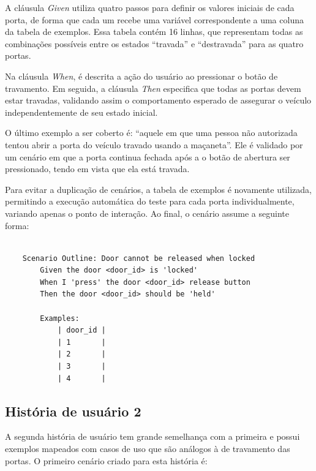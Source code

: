 A cláusula \textit{Given} utiliza quatro passos para definir os valores iniciais de cada porta, de forma que cada um recebe uma variável correspondente a uma coluna da 
tabela de exemplos. Essa tabela contém 16 linhas, que representam todas as combinações possíveis entre os estados ``travada'' e ``destravada'' para as quatro portas.

Na cláusula \textit{When}, é descrita a ação do usuário ao pressionar o botão de travamento. Em seguida, a cláusula \textit{Then} especifica que todas as portas devem estar travadas, 
validando assim o comportamento esperado de assegurar o veículo independentemente de seu estado inicial.

O último exemplo a ser coberto é: ``aquele em que uma pessoa não autorizada tentou abrir a porta do veículo travado usando a maçaneta''. Ele é validado por um 
cenário em que a porta continua fechada após a o botão de abertura ser pressionado, tendo em vista que ela está travada.

Para evitar a duplicação de cenários, a tabela de exemplos é novamente utilizada, permitindo a execução automática do teste para cada porta individualmente, variando 
apenas o ponto de interação. Ao final, o cenário assume a seguinte forma:

\begin{verbatim}

    Scenario Outline: Door cannot be released when locked
        Given the door <door_id> is 'locked'
        When I 'press' the door <door_id> release button
        Then the door <door_id> should be 'held'

        Examples:
            | door_id |
            | 1       |
            | 2       |
            | 3       |
            | 4       |

\end{verbatim}


\subsection{História de usuário 2}

A segunda história de usuário tem grande semelhança com a primeira e possui exemplos mapeados com casos de uso que são análogos à de travamento das portas. O 
primeiro cenário criado para esta história é:

